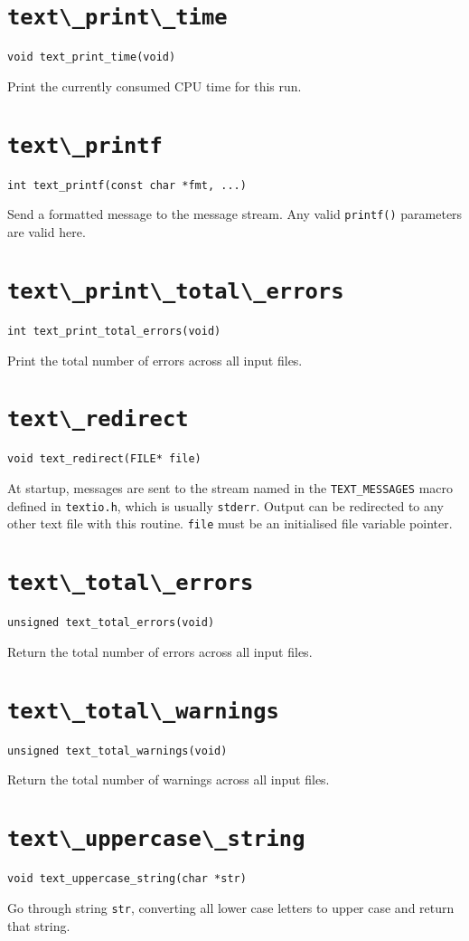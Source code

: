 \section{\protect\verb+text\_print\_time+}
\begin{verbatim}
void text_print_time(void)
\end{verbatim}
Print the currently consumed CPU time for this run.

\section{\protect\verb+text\_printf+}
\begin{verbatim}
int text_printf(const char *fmt, ...)
\end{verbatim}
Send a formatted message to the message stream. Any valid {\tt printf()}
parameters are valid here.

\section{\protect\verb+text\_print\_total\_errors+}
\begin{verbatim}
int text_print_total_errors(void)
\end{verbatim}
Print the total number of errors across all input files.

\section{\protect\verb+text\_redirect+}
\begin{verbatim}
void text_redirect(FILE* file)
\end{verbatim}
At startup, messages are sent to the stream named in the
\verb+TEXT_MESSAGES+ macro defined in \verb+textio.h+, which is usually
{\tt stderr}. Output can be redirected to any other text file with this
routine. {\tt file} must be an initialised file variable pointer.

\section{\protect\verb+text\_total\_errors+}
\begin{verbatim}
unsigned text_total_errors(void)
\end{verbatim}
Return the total number of errors across all input files.

\section{\protect\verb+text\_total\_warnings+}
\begin{verbatim}
unsigned text_total_warnings(void)
\end{verbatim}
Return the total number of warnings across all input files.

\section{\protect\verb+text\_uppercase\_string+}
\begin{verbatim}
void text_uppercase_string(char *str)
\end{verbatim}
Go through string {\tt str}, converting all lower case letters to upper
case and return that string.







